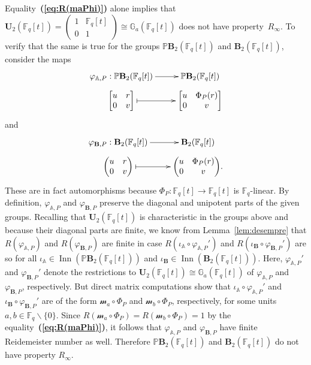 \documentclass[a4paper,11pt]{amsart}
\numberwithin{equation}{section}
\theoremstyle{plain}
\theoremstyle{definition}
\newcommand{\F}{\mathbb{F}}
\newcommand{\mbU}{\mathbf{U}} %
\newcommand{\Addi}{\mathbb{G}_{a}} %
\newcommand{\mbB}{\mathbf{B}} %
\newcommand{\PB}{\mathbb{P}\mathbf{B}} %
\newcommand{\phee}{\varphi} %
\newcommand{\set}[1]{\{ #1 \}}
\newcommand{\mc}{\mathcal}
\newcommand{\Ri}{R_{\infty}} %
\newcommand{\bref}[1]{{\bf(\ref{#1})}} %
\DeclareMathOperator{\Inn}{Inn}
\begin{document}
Equality~\bref{eq:R(maPhi)} alone implies that $\mbU_2(\F_q[t]) = \left( \begin{smallmatrix} 1 & \F_q[t] \\ 0 & 1 \end{smallmatrix} \right) \cong \Addi(\F_q[t])$ does not have property~$\Ri$. To verify that the same is true for the groups $\PB_2(\F_q[t])$ and $\mbB_2(\F_q[t])$, consider the maps 
\[
\xymatrix@R=2mm{ \phee_{\mathbb{A},P} : \PB_2(\F_q[t]) \ar[r] & \PB_2(\F_q[t]) \\ 
{\begin{bmatrix} u & r \\ 0 & v \end{bmatrix}} \ar@{|->}[r] & {\begin{bmatrix} u & \Phi_P(r) \\ 0 & v \end{bmatrix}} } 
\]
and 
\[ 
\xymatrix@R=2mm{ \phee_{\mathbf{B},P} : \mbB_2(\F_q[t]) \ar[r] & \mbB_2(\F_q[t]) \\ 
{\begin{pmatrix} u & r \\ 0 & v \end{pmatrix}} \ar@{|->}[r] & {\begin{pmatrix} u & \Phi_P(r) \\ 0 & v \end{pmatrix}}.} 
\]
These are in fact automorphisms because $\Phi_P : \F_q[t] \to \F_q[t]$ is $\F_q$-linear. By definition, $\phee_{\mathbb{A},P}$ and $\phee_{\mathbf{B},P}$ preserve the diagonal and unipotent parts of the given groups. 
Recalling that $\mbU_2(\F_q[t])$ is characteristic in the groups above and because their diagonal parts are finite, 
we know from Lemma~\ref{lem:desempre} that $R(\phee_{\mathbb{A},P})$ and $R(\phee_{\mathbf{B},P})$ are finite in case $R(\iota_{\mathbb{A}} \circ \phee_{\mathbb{A},P}')$ and $R(\iota_{\mathbf{B}} \circ \phee_{\mathbf{B},P}')$ are so for all $\iota_{\mathbb{A}} \in \Inn(\PB_2(\F_q[t]))$ and $\iota_{\mbB} \in \Inn(\mbB_2(\F_q[t]))$. Here, $\phee_{\mathbb{A},P}'$ and $\phee_{\mbB,P}'$ denote the restrictions to $\mbU_2(\F_q[t]) \cong \Addi(\F_q[t])$ of $\phee_{\mathbb{A},P}$ and $\phee_{\mbB,P}$, respectively. But direct matrix computations show that $\iota_{\mathbb{A}} \circ \phee_{\mathbb{A},P}'$ and $\iota_{\mathbf{B}} \circ \phee_{\mathbf{B},P}'$ are of the form $\mc{m}_a \circ \Phi_P$ and $\mc{m}_b \circ \Phi_P$, respectively, for some units $a,b \in \F_q \backslash \set{0}$. Since $R(\mc{m}_a \circ \Phi_P) = R(\mc{m}_b \circ \Phi_P) = 1$ by the equality~\bref{eq:R(maPhi)}, it follows that $\phee_{\mathbb{A},P}$ and $\phee_{\mbB,P}$ have finite Reidemeister number as well. Therefore $\PB_2(\F_q[t])$ and $\mbB_2(\F_q[t])$ do not have property $\Ri$.
\end{document}
